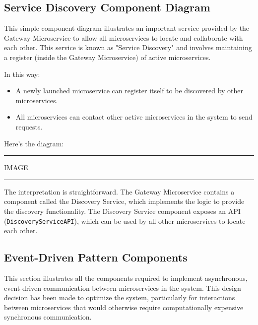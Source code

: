 \subsection{Service Discovery Component Diagram}

This simple component diagram illustrates an important service provided by the Gateway Microservice to allow all microservices to locate and collaborate with each other. This service is known as "Service Discovery" and involves maintaining a register (inside the Gateway Microservice) of active microservices.

In this way:
\begin{itemize}
    \item A newly launched microservice can register itself to be discovered by other microservices.
    \item All microservices can contact other active microservices in the system to send requests.
\end{itemize}

Here’s the diagram:

\vspace{20pt}
\hrule
\vspace{10pt}
IMAGE
\vspace{10pt}
\hrule
\vspace{20pt}

The interpretation is straightforward. The Gateway Microservice contains a component called the Discovery Service, which implements the logic to provide the discovery functionality. The Discovery Service component exposes an API (\texttt{DiscoveryServiceAPI}), which can be used by all other microservices to locate each other.

\subsection{Event-Driven Pattern Components}

This section illustrates all the components required to implement asynchronous, event-driven communication between microservices in the system. This design decision has been made to optimize the system, particularly for interactions between microservices that would otherwise require computationally expensive synchronous communication.

